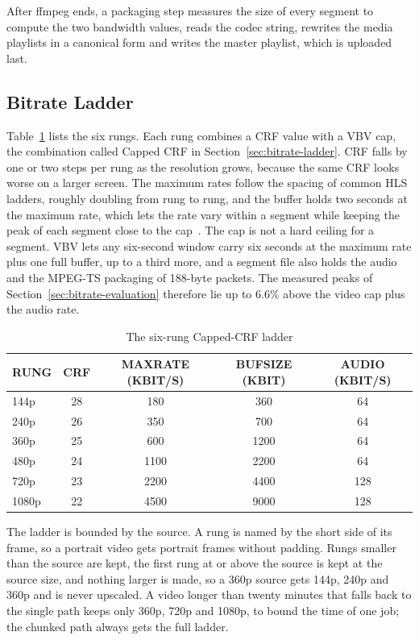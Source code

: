 After ffmpeg ends, a packaging step measures the size of every segment to compute the two bandwidth
values, reads the codec string, rewrites the media playlists in a canonical form and writes the
master playlist, which is uploaded last.

\subsection{Bitrate Ladder}
\label{sec:ladder-design}

Table~\ref{tab:ladder} lists the six rungs. Each rung combines a CRF value with a VBV cap, the
combination called Capped CRF in Section~\ref{sec:bitrate-ladder}. CRF falls by one or two steps per
rung as the resolution grows, because the same CRF looks worse on a larger screen. The maximum rates
follow the spacing of common HLS ladders, roughly doubling from rung to rung, and the buffer holds
two seconds at the maximum rate, which lets the rate vary within a segment while keeping the peak of
each segment close to the cap~\cite{applehlsauthoring, ffmpegdocs}. The cap is not a hard ceiling
for a segment. VBV lets any six-second window carry six seconds at the maximum rate plus one full
buffer, up to a third more, and a segment file also holds the audio and the MPEG-TS packaging of
188-byte packets. The measured peaks of Section~\ref{sec:bitrate-evaluation} therefore lie up to
6.6\% above the video cap plus the audio rate.

\begin{table}[H]
\centering
\caption{The six-rung Capped-CRF ladder}
\label{tab:ladder}
\small
\begin{tabular}{l c c c c}
\toprule
\textbf{RUNG} & \textbf{CRF} & \textbf{MAXRATE (KBIT/S)} & \textbf{BUFSIZE (KBIT)} & \textbf{AUDIO (KBIT/S)} \\
\midrule
144p & 28 & 180 & 360 & 64 \\
240p & 26 & 350 & 700 & 64 \\
360p & 25 & 600 & 1200 & 64 \\
480p & 24 & 1100 & 2200 & 64 \\
720p & 23 & 2200 & 4400 & 128 \\
1080p & 22 & 4500 & 9000 & 128 \\
\bottomrule
\end{tabular}
\end{table}

The ladder is bounded by the source. A rung is named by the short side of its frame, so a portrait
video gets portrait frames without padding. Rungs smaller than the source are kept, the first rung
at or above the source is kept at the source size, and nothing larger is made, so a 360p source
gets 144p, 240p and 360p and is never upscaled. A video longer than twenty minutes that falls back to
the single path keeps only 360p, 720p and 1080p, to bound the time of one job; the chunked path
always gets the full ladder.


